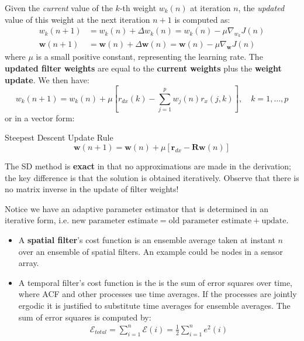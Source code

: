 Given the \textit{current} value of the \( k \)-th weight \( w_k(n) \) at iteration \( n \), the \textit{updated} value of this weight at the next iteration \( n+1 \) is computed as:
\begin{align}
w_k(n + 1) &= w_k(n) + \Delta w_k(n) = w_k(n) - \mu \nabla_{w_k} J(n) \\
\mathbf{w}(n + 1) &= \mathbf{w}(n) + \Delta \mathbf{w}(n) = \mathbf{w}(n) - \mu \nabla_{\mathbf{w}} J(n)
\end{align}
where \(\mu\) is a small positive constant, representing the learning rate. The \textbf{updated filter weights} are equal to the \textbf{current weights} plus the \textbf{weight update}. We then have:
\begin{equation}
w_k(n + 1) = w_k(n) + \mu \left[ r_{dx}(k) - \sum_{j=1}^p w_j(n)r_x(j, k) \right], \quad k = 1, \ldots, p
\end{equation}
or in a vector form:
\begin{definitionbox}{Steepest Descent Update Rule}
\begin{equation}
\mathbf{w}(n + 1) = \mathbf{w}(n) + \mu \left[ \mathbf{r}_{dx} - \mathbf{R}\mathbf{w}(n) \right]
\end{equation}
\end{definitionbox}

The SD method is \textbf{exact} in that no approximations are made in the derivation; the key difference is that the solution is obtained iteratively. Observe that there is no matrix inverse in the update of filter weights!

Notice we have an adaptive parameter estimator that is determined in an iterative form, i.e. $\text{new parameter estimate} = \text{old parameter estimate} + \text{update}$.

\begin{itemize}
    \item A \textbf{spatial filter}'s cost function is an ensemble average taken at instant $n$ over an ensemble of spatial filters. An example could be nodes in a sensor array.
    \item A temporal filter's cost function is the is the sum of error squares over time, where ACF and other processes use time averages. If the processes are jointly ergodic it is justified to substitute time averages for ensemble averages. The sum of error squares is computed by:
    \begin{align}
        \mathcal{E}_{total}=\sum_{i=1}^n\mathcal{E}(i)=\frac12\sum_{i=1}^ne^2(i)
    \end{align}
\end{itemize}

